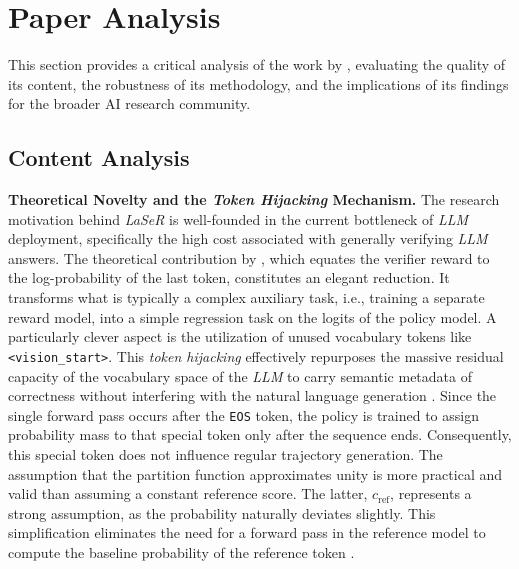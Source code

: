 \documentclass[a4paper,oneside,10pt,ngerman,english]{scrartcl}
\begin{document}

\section{Paper Analysis}
\label{sec:paperanalysis}

This section provides a critical analysis of the work by \citet{laser}, evaluating the quality of its content, the robustness of its methodology, and the implications of its findings for the broader AI research community.

\subsection{Content Analysis}
\textbf{Theoretical Novelty and the \textit{Token Hijacking} Mechanism.} The research motivation behind \textit{LaSeR} is well-founded in the current bottleneck of \textit{LLM} deployment, specifically the high cost associated with generally verifying \textit{LLM} answers. The theoretical contribution by \citet{laser}, which equates the verifier reward to the log-probability of the last token, constitutes an elegant reduction. It transforms what is typically a complex auxiliary task, i.e., training a separate reward model, into a simple regression task on the logits of the policy model. A particularly clever aspect is the utilization of unused vocabulary tokens like \texttt{<vision\_start>}. This \textit{token hijacking} effectively repurposes the massive residual capacity of the vocabulary space of the \textit{LLM} to carry semantic metadata of correctness without interfering with the natural language generation \citep{laser}. Since the single forward pass occurs after the \texttt{EOS} token, the policy is trained to assign probability mass to that special token only after the sequence ends. Consequently, this special token does not influence regular trajectory generation. The assumption that the partition function approximates unity is more practical and valid than assuming a constant reference score. The latter, $c_{\text{ref}}$, represents a strong assumption, as the probability naturally deviates slightly. This simplification eliminates the need for a forward pass in the reference model to compute the baseline probability of the reference token \citep{laser}.
\end{document}
